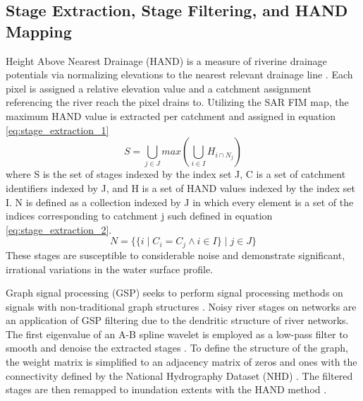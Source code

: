 \documentclass{article}
\begin{document}
\subsection{Stage Extraction, Stage Filtering, and HAND Mapping}
\label{ssec:stage_extraction_filter_mapping}
%
Height Above Nearest Drainage (HAND) is a measure of riverine drainage potentials via normalizing elevations to the nearest relevant drainage line \cite{nobre2016hand,aristizabal2020cahaba}. 
Each pixel is assigned a relative elevation value and a catchment assignment referencing the river reach the pixel drains to.
Utilizing the SAR FIM map, the maximum HAND value is extracted per catchment and assigned in equation \ref{eq:stage_extraction_1} 
%
\begin{equation}
\label{eq:stage_extraction_1}
S = \bigcup_{j \in J} max(\bigcup_{i \in I} H_{i \cap N_j})
\end{equation}
%
where S is the set of stages indexed by the index set J, C is a set of catchment identifiers indexed by J, and H is a set of HAND values indexed by the index set I.
N is defined as a collection indexed by J in which every element is a set of the indices corresponding to catchment j such defined in equation \ref{eq:stage_extraction_2}.
%
\begin{equation}
\label{eq:stage_extraction_2}
N = \{\{ i \mid C_i=C_j \land i \in I \} \mid j \in J \}
\end{equation}
%
These stages are susceptible to considerable noise and demonstrate significant, irrational variations in the water surface profile. 

Graph signal processing (GSP) seeks to perform signal processing methods on signals with non-traditional graph structures \cite{gavili2017shift,defferrard2017pygsp,ortega2018graph}. 
Noisy river stages on networks are an application of GSP filtering due to the dendritic structure of river networks.
The first eigenvalue of an A-B spline wavelet is employed as a low-pass filter to smooth and denoise the extracted stages \cite{defferrard2017pygsp}.
To define the structure of the graph, the weight matrix is simplified to an adjacency matrix of zeros and ones with the connectivity defined by the National Hydrography Dataset (NHD) \cite{usgs2019national}.
The filtered stages are then remapped to inundation extents with the HAND method \cite{nobre2016hand,aristizabal2020cahaba}.   
%
\end{document}
